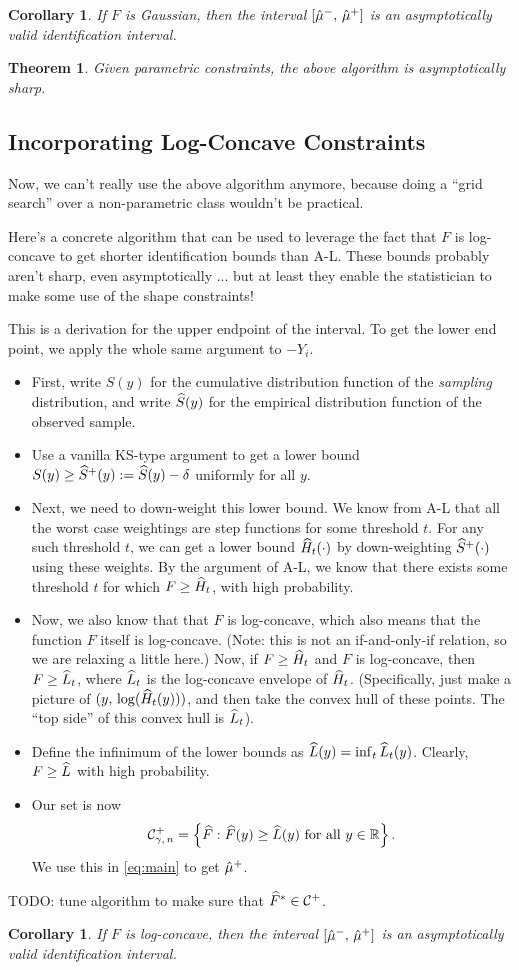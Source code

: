 \documentclass{article}
\theoremstyle{plain}
\newtheorem{coro}[prop]{Corollary}
\newtheorem{theo}[prop]{Theorem}
\theoremstyle{definition}
\theoremstyle{remark}
\begin{document}
\begin{coro}
If $F$ is Gaussian, then the interval $[\hat{\mu}^-, \, \hat{\mu}^+]$ is an asymptotically valid identification interval.
\end{coro}

\begin{theo}
Given parametric constraints, the above algorithm is asymptotically sharp.
\end{theo}

\subsection{Incorporating Log-Concave Constraints}

Now, we can't really use the above algorithm anymore, because doing a ``grid search''
over a non-parametric class wouldn't be practical.

Here's a concrete algorithm that can be used to leverage the fact that $F$ is log-concave
to get shorter identification bounds than A-L. These bounds probably aren't 
sharp, even asymptotically ... but at least they enable the statistician to make
some use of the shape constraints!

This is a derivation for the upper endpoint of the interval.
To get the lower end point, we apply the whole same argument to $-Y_i$.
\begin{itemize}
\item First, write $S(y)$ for the cumulative distribution function of the
\emph{sampling} distribution, and write $\widehat{S}(y)$ for the empirical distribution
function of the observed sample.
\item Use a vanilla KS-type argument to get a lower bound $S(y) \geq \widehat{S}^+(y) := \widehat{S}(y) - \delta$
uniformly for all $y$.
\item Next, we need to down-weight this lower bound. We know from A-L that all the
worst case weightings are step functions for some threshold $t$. For any such threshold
$t$, we can get a lower bound $\widehat{H}_t(\cdot)$ by down-weighting $\widehat{S}^+(\cdot)$ using
these weights. By the argument of A-L, we know that there exists some threshold $t$
for which $F \geq \widehat{H}_t$, with high probability.
\item Now, we also know that that $F$ is log-concave, which also means that the function
$F$ itself is log-concave. (Note: this is not an if-and-only-if relation, so we are relaxing
a little here.) Now, if $F \geq \widehat{H}_t$ and $F$ is log-concave, then $F \geq \widehat{L}_t$,
where $\widehat{L}_t$ is the log-concave envelope of $\widehat{H}_t$. (Specifically, just make a picture
of $(y, \, \log(\widehat{H}_t(y)))$, and then take the convex hull of these points. The ``top side''
of this convex hull is $\widehat{L}_t$).
\item Define the infinimum of the lower bounds as $\widehat{L}(y) = \inf_t \widehat{L}_t(y)$.
Clearly, $F \geq \widehat{L}$ with high probability. 
\item Our set is now
$$ \mathcal{C}^+_{\gamma, \, n} = \left\{\widehat{F} : \widehat{F}(y) \geq \widehat{L}(y) \text{ for all } y \in \mathbb{R}\right\}. $$
We use this in \eqref{eq:main} to get $\hat{\mu}^+$.
\end{itemize}

TODO: tune algorithm to make sure that $\widehat{F}^* \in \mathcal{C}^+$.

\begin{coro}
If $F$ is log-concave, then the interval $[\hat{\mu}^-, \, \hat{\mu}^+]$ is an asymptotically valid identification interval.
\end{coro}
\end{document}
